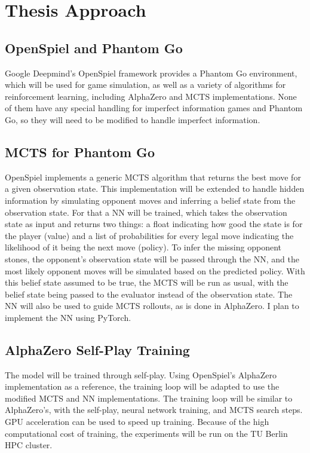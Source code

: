 \documentclass[12pt,oneside,openright]{article}
\begin{document}
\section{Thesis Approach}


\subsection{OpenSpiel and Phantom Go}

Google Deepmind's OpenSpiel framework provides a Phantom Go environment,
which will be used for game simulation, as well as a variety of algorithms
for reinforcement learning, including AlphaZero and MCTS implementations.
None of them have any special handling for imperfect information games and
Phantom Go, so they will need to be modified to handle imperfect information.

\subsection{MCTS for Phantom Go}

OpenSpiel implements a generic MCTS algorithm that returns the best move
for a given observation state. This implementation will be extended to
handle hidden information by simulating opponent moves and inferring a
belief state from the observation state. For that a NN will be trained,
which takes the observation state as input and returns two things: a float
indicating how good the state is for the player (value) and a list of
probabilities for every legal move indicating the likelihood of it being
the next move (policy). To infer the missing opponent stones, the opponent's
observation state will be passed through the NN, and the most likely opponent
moves will be simulated based on the predicted policy. With this belief
state assumed to be true, the MCTS will be run as usual, with the belief
state being passed to the evaluator instead of the observation state.
The NN will also be used to guide MCTS rollouts, as is done in AlphaZero.
I plan to implement the NN using PyTorch.

\subsection{AlphaZero Self-Play Training}

The model will be trained through self-play. Using OpenSpiel's AlphaZero
implementation as a reference, the training loop will be adapted to use
the modified MCTS and NN implementations. The training loop will be similar
to AlphaZero's, with the self-play, neural network training, and MCTS search steps.
GPU acceleration can be used to speed up training. Because of the high
computational cost of training, the experiments will be run on the TU Berlin
HPC cluster.
\end{document}

